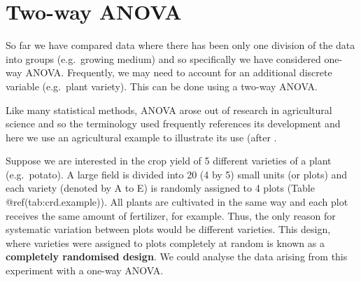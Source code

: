 \documentclass[
  oneside]{krantz}
\begin{document}
\hypertarget{two-way-anova}{%
\section{Two-way ANOVA}\label{two-way-anova}}

So far we have compared data where there has been only one division of the data into groups (e.g.~growing medium) and so specifically we have considered one-way ANOVA. Frequently, we may need to account for an additional discrete variable (e.g.~plant variety). This can be done using a two-way ANOVA.

Like many statistical methods, ANOVA arose out of research in agricultural science and so the terminology used frequently references its development and here we use an agricultural example to illustrate its use (after \citep{ClarkeCooke1998}.

Suppose we are interested in the crop yield of 5 different varieties of a plant (e.g.~potato). A large field is divided into 20 (4 by 5) small units (or plots) and each variety (denoted by A to E) is randomly assigned to 4 plots (Table @ref(tab:crd.example)). All plants are cultivated in the same way and each plot receives the same amount of fertilizer, for example. Thus, the only reason for systematic variation between plots would be different varieties. This design, where varieties were assigned to plots completely at random is known as a \textbf{completely randomised design}. We could analyse the data arising from this experiment with a one-way ANOVA.
\end{document}
